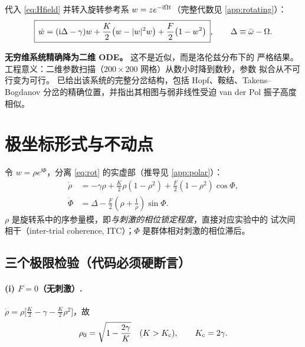 代入 \cref{eq:Hfield} 并转入旋转参考系 $w=ze^{-\mathrm{i}\Omega t}$（完整代数见
\cref{app:rotating}）：
%
\begin{equation}\label{eq:rot}
\boxed{\,\dot w=(\mathrm{i}\Delta-\gamma)w+\frac{K}{2}\bigl(w-|w|^2w\bigr)
       +\frac{F}{2}\bigl(1-w^2\bigr)\,},
\qquad \Delta\equiv\bar{\omega}-\Omega .
\end{equation}

\noindent\textbf{无穷维系统精确降为二维 ODE。} 这不是近似，而是洛伦兹分布下的
严格结果。工程意义：二维参数扫描（$200\times200$ 网格）从数小时降到数秒，参数
拟合从不可行变为可行。\citet{Childs2008} 已给出该系统的完整分岔结构，包括
Hopf、鞍结、Takens--Bogdanov 分岔的精确位置，并指出其相图与弱非线性受迫
van der Pol 振子高度相似。

\section{极坐标形式与不动点}
\label{sec:polar}

令 $w=\rho e^{\ii\Phi}$，分离 \cref{eq:rot} 的实虚部（推导见
\cref{app:polar}）：
%
\begin{subequations}\label{eq:polar}
\begin{align}
\dot\rho &= -\gamma\rho+\frac{K}{2}\rho(1-\rho^2)
            +\frac{F}{2}(1-\rho^2)\cos\Phi , \label{eq:polar-a}\\[2pt]
\dot\Phi &= \Delta-\frac{F}{2}\left(\rho+\frac{1}{\rho}\right)\sin\Phi .
            \label{eq:polar-b}
\end{align}
\end{subequations}
%
$\rho$ 是旋转系中的序参量模，即\emph{与刺激的相位锁定程度}，直接对应实验中的
试次间相干（inter-trial coherence, ITC）；$\Phi$ 是群体相对刺激的相位滞后。

\subsection{三个极限检验（代码必须硬断言）}
\label{sec:limits}

\paragraph{(i) $F=0$（无刺激）.}
$\dot\rho=\rho\bigl[\frac{K}{2}-\gamma-\frac{K}{2}\rho^2\bigr]$，故
%
\begin{equation}\label{eq:rho0}
\rho_0=\sqrt{1-\frac{2\gamma}{K}}\quad(K>K_{\mathrm{c}}),
\qquad K_{\mathrm{c}}=2\gamma .
\end{equation}

